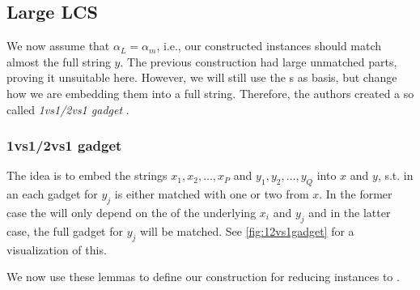 \subsection{Large LCS}

We now assume that $\alpha_L = \alpha_m$, i.e., our constructed instances should match almost the full string $y$.
The previous construction had large unmatched parts, proving it unsuitable here.
However, we will still use the \nvgName{}s as basis, but change how we are embedding them into a full string.
Therefore, the authors created a so called \emph{1vs1/2vs1 gadget} \cite[section 9.2.1]{Bringman.2018}.

\subsubsection{1vs1/2vs1 gadget}
The idea is to embed the strings $x_1, x_2, \ldots, x_P$ and $y_1, y_2, \ldots, y_Q$ into $x$ and $y$, s.t. in an \lcs{} each gadget for $y_j$ is either matched with one or two from $x$.
In the former case the \lcs{} will only depend on the \lcs{} of the underlying $x_i$ and $y_j$ and in the latter case, the full gadget for $y_j$ will be matched.
See \autoref{fig:12vs1gadget} for a visualization of this.













We now use these lemmas to define our construction for reducing \ov{} instances to \lcs{}.

